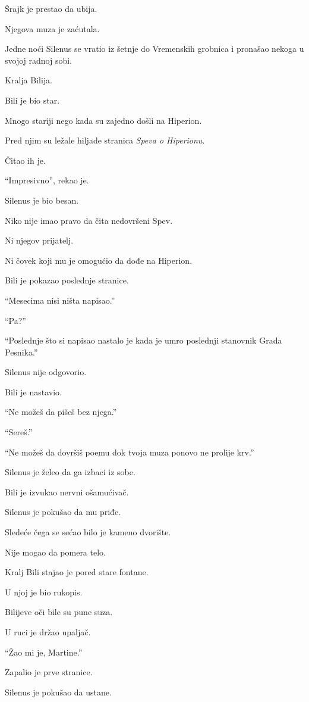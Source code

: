 Šrajk je prestao da ubija.

Njegova muza je zaćutala.

\bigskip

Jedne noći Silenus se vratio iz šetnje do Vremenskih grobnica i pronašao nekoga u svojoj radnoj sobi.

Kralja Bilija.

Bili je bio star.

Mnogo stariji nego kada su zajedno došli na Hiperion.

Pred njim su ležale hiljade stranica \emph{Speva o Hiperionu}.

Čitao ih je.

``Impresivno'', rekao je.

Silenus je bio besan.

Niko nije imao pravo da čita nedovršeni Spev.

Ni njegov prijatelj.

Ni čovek koji mu je omogućio da dođe na Hiperion.

Bili je pokazao poslednje stranice.

``Mesecima nisi ništa napisao.''

``Pa?''

``Poslednje što si napisao nastalo je kada je umro poslednji stanovnik Grada Pesnika.''

Silenus nije odgovorio.

Bili je nastavio.

``Ne možeš da pišeš bez njega.''

``Sereš.''

``Ne možeš da dovršiš poemu dok tvoja muza ponovo ne prolije krv.''

Silenus je želeo da ga izbaci iz sobe.

Bili je izvukao nervni ošamućivač.

Silenus je pokušao da mu priđe.

Sledeće čega se sećao bilo je kameno dvorište.

Nije mogao da pomera telo.

Kralj Bili stajao je pored stare fontane.

U njoj je bio rukopis.

Bilijeve oči bile su pune suza.

U ruci je držao upaljač.

``Žao mi je, Martine.''

Zapalio je prve stranice.

Silenus je pokušao da ustane.

